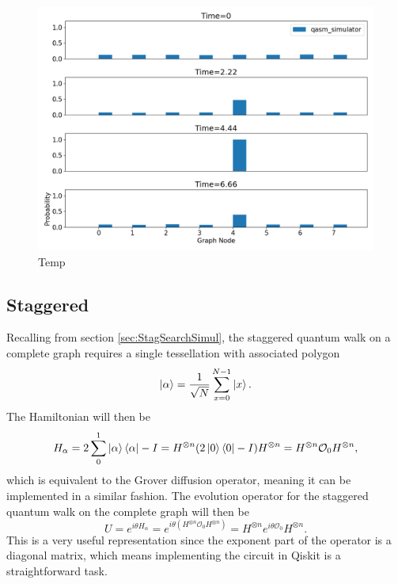 \documentclass[../../dissertation.tex]{subfiles}
\begin{document}
\begin{figure}[!h]
	\centering
	\includegraphics[scale=0.40]{img/Qiskit/ContQuantumWalk/Search/ContQW_N3_S2.png}
	\caption{Temp}
	\label{fig:contSearchResultCircQistkit}
\end{figure}

\subsection{Staggered}
Recalling from section \ref{sec:StagSearchSimul}, the staggered quantum walk on
a complete graph requires a single tessellation with associated polygon
\begin{equation}
	\ket{\alpha} = \frac{1}{\sqrt{N}} \sum_{x=0}^{N-1} \ket{x}.
\end{equation}
The Hamiltonian will then be 
\begin{equation}
	H_\alpha = 2\sum_0^1\ket{\alpha}\bra{\alpha} - I = H^{\otimes n} (2\ket{0}\bra{0} - I) H^{\otimes n} = H^{\otimes n} \mathcal{O}_0 H^{\otimes n},
\end{equation}
which is equivalent to the Grover diffusion operator, meaning it can be
implemented in a similar fashion. The evolution operator for the staggered
quantum walk on the complete graph will then be 
\begin{equation}
	U = e^{i\theta H_\alpha} = e^{i\theta(H^{\otimes n} \mathcal{O}_0 H^{\otimes n})} = H^{\otimes n} e^{i\theta\mathcal{O}_0} H^{\otimes n}.
\end{equation}
This is a very useful representation since the exponent part of the operator is
a diagonal matrix, which means implementing the circuit in Qiskit is a
straightforward task.\par 
\end{document}
